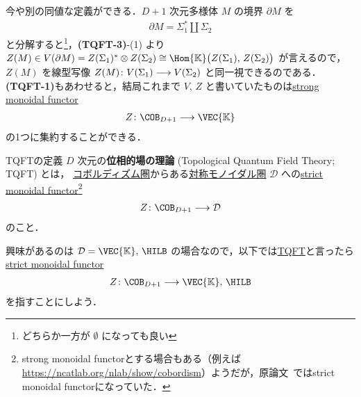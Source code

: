 \documentclass[TQFT_main]{subfiles}
\begin{document}
今や別の同値な定義ができる．$D+1$ 次元多様体 $M$ の境界 $\partial M$ を
\begin{align}
    \partial M = \Sigma_1^* \amalg \Sigma_2
\end{align}
と分解すると\footnote{どちらか一方が $\emptyset$ になっても良い}，\textsf{\textbf{(TQFT-3)}}-(1) より
$Z(M) \in V(\partial M) = Z(\Sigma_1)^* \otimes Z(\Sigma_2) \cong \Hom{\mathbb{K}} \bigl( Z(\Sigma_1),\, Z(\Sigma_2) \bigr)$ が言えるので，$Z(M)$ を線型写像 $Z(M) \colon V(\Sigma_1) \longrightarrow V(\Sigma_2)$ と同一視できるのである．
\textsf{\textbf{(TQFT-1)}}もあわせると，結局これまで $V,\, Z$ と書いていたものは\hyperref[def:monidal-functor]{strong monoidal functor}
\begin{align}
    Z \colon \COB_{D+1} \lto \VEC{\mathbb{K}}
\end{align}
の1つに集約することができる．

\begin{mydef}[label=def:TQFT]{TQFTの定義}
    $D$ 次元の\textbf{位相的場の理論} (Topological Quantum Field Theory; TQFT) とは，
    \hyperref[Cob-string]{コボルディズム圏}からある\hyperref[def:braided-monoidal]{対称モノイダル圏} $\mathcal{D}$ への\hyperref[def:monidal-functor]{strict monoidal functor}\footnote{strong monoidal functorとする場合もある（例えば\url{https://ncatlab.org/nlab/show/cobordism}）ようだが，原論文~\cite{Atiyah1988tqft}ではstrict monoidal functorになっていた．}
    \begin{align}
        Z \colon \COB_{D+1} \lto \mathcal{D}
    \end{align}
    のこと．
\end{mydef}

興味があるのは $\mathcal{D} = \VEC{\mathbb{K}},\, \HILB$ の場合なので，以下では\hyperref[ax:Atiyah-TQFT]{TQFT}と言ったら\hyperref[def:monidal-functor]{strict monoidal functor}
\begin{align}
    Z \colon \COB_{D+1} \lto \VEC{\mathbb{K}},\, \HILB
\end{align}
を指すことにしよう．





\end{document}
